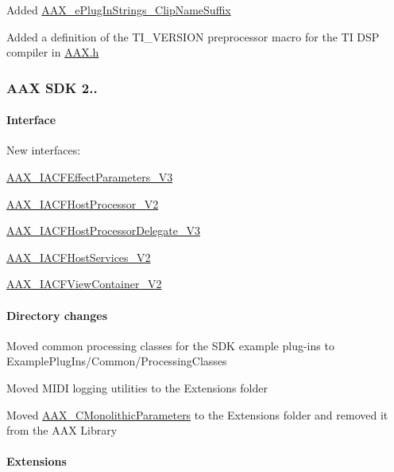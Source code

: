 \begin{DoxyItemize}
\item Added \mbox{\hyperlink{a00491_a86f7310877399d9d4d2ea4863d472476ac2ad5da7b876541a94ca9471193b7195}{A\+A\+X\+\_\+e\+Plug\+In\+Strings\+\_\+\+Clip\+Name\+Suffix}} 
\item Added a definition of the {\ttfamily T\+I\+\_\+\+V\+E\+R\+S\+I\+ON} preprocessor macro for the TI D\+SP compiler in \mbox{\hyperlink{a00392}{A\+A\+X.\+h}} 
\end{DoxyItemize}\hypertarget{a00847_aax_sdk_2p2p0}{}\subsubsection{A\+A\+X S\+D\+K 2..}\label{a00847_aax_sdk_2p2p0}
\hypertarget{a00847_aax_sdk_2p2p0_Interface}{}\paragraph{Interface}\label{a00847_aax_sdk_2p2p0_Interface}

\begin{DoxyItemize}
\item New interfaces\+: 
\begin{DoxyItemize}
\item \mbox{\hyperlink{a01681}{A\+A\+X\+\_\+\+I\+A\+C\+F\+Effect\+Parameters\+\_\+\+V3}} 
\item \mbox{\hyperlink{a01697}{A\+A\+X\+\_\+\+I\+A\+C\+F\+Host\+Processor\+\_\+\+V2}} 
\item \mbox{\hyperlink{a01709}{A\+A\+X\+\_\+\+I\+A\+C\+F\+Host\+Processor\+Delegate\+\_\+\+V3}} 
\item \mbox{\hyperlink{a01717}{A\+A\+X\+\_\+\+I\+A\+C\+F\+Host\+Services\+\_\+\+V2}} 
\item \mbox{\hyperlink{a01769}{A\+A\+X\+\_\+\+I\+A\+C\+F\+View\+Container\+\_\+\+V2}} 
\end{DoxyItemize}
\end{DoxyItemize}\hypertarget{a00847_aax_sdk_2p2p0_Directory_changes}{}\paragraph{Directory changes}\label{a00847_aax_sdk_2p2p0_Directory_changes}

\begin{DoxyItemize}
\item Moved common processing classes for the S\+DK example plug-\/ins to Example\+Plug\+Ins/\+Common/\+Processing\+Classes 
\item Moved M\+I\+DI logging utilities to the Extensions folder 
\item Moved \mbox{\hyperlink{a01969}{A\+A\+X\+\_\+\+C\+Monolithic\+Parameters}} to the Extensions folder and removed it from the A\+AX Library 
\end{DoxyItemize}\hypertarget{a00847_aax_sdk_2p0p0_Extensions}{}\paragraph{Extensions}\label{a00847_aax_sdk_2p0p0_Extensions}

